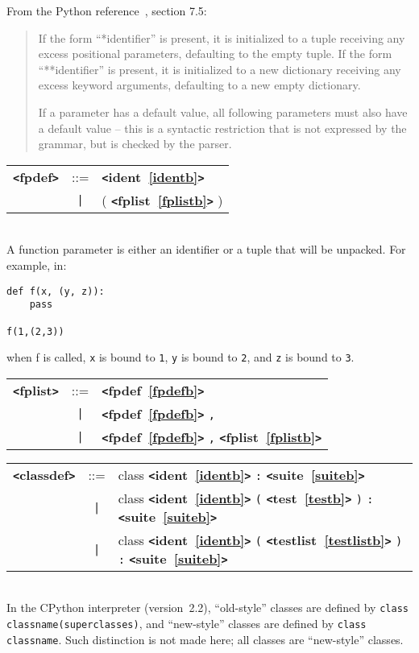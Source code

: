 From the Python reference~\cite{pythonlang}, section 7.5:
\begin{quote}
If the form ``*identifier'' is present, it is initialized to a tuple receiving 
any excess positional parameters, defaulting to the empty tuple. 
If the form ``**identifier'' is present, it is initialized to a new dictionary 
receiving any excess keyword arguments, defaulting to a new empty dictionary.

If a parameter has a default value, all following parameters must also have a 
default value -- this is a syntactic restriction that is not expressed by the grammar, but is checked by the parser.   
\end{quote}

\label{fpdefb}
\begin{tabular}{lcl}
{\bf \verb+<+fpdef\verb+>+} & ::=  & {\bf \verb+<+ident~\ref{identb}\verb+>+}  \\
 & \verb+|+  & ( {\bf \verb+<+fplist~\ref{fplistb}\verb+>+}  ) \\
\end{tabular} \\

A function parameter is either an identifier or a tuple that will be unpacked.  For example, in:
\begin{verbatim}
def f(x, (y, z)):
    pass

f(1,(2,3))
\end{verbatim}
when f is called, \verb|x| is bound to \verb|1|, \verb|y| is bound to \verb|2|, and
\verb|z| is bound to \verb|3|. \\

\label{fplistb}
\begin{tabular}{lcl}
{\bf \verb+<+fplist\verb+>+} & ::=  & {\bf \verb+<+fpdef~\ref{fpdefb}\verb+>+}  \\
 & \verb+|+  & {\bf \verb+<+fpdef~\ref{fpdefb}\verb+>+}  \verb|,| \\
 & \verb+|+  & {\bf \verb+<+fpdef~\ref{fpdefb}\verb+>+}  \verb|,| {\bf \verb+<+fplist~\ref{fplistb}\verb+>+}  \\
\end{tabular}

\label{classdefb}
\begin{tabular}{lcl}
{\bf \verb+<+classdef\verb+>+} & ::=  & class {\bf \verb+<+ident~\ref{identb}\verb+>+}  \verb|:| {\bf \verb+<+suite~\ref{suiteb}\verb+>+}  \\
 & \verb+|+  & class {\bf \verb+<+ident~\ref{identb}\verb+>+}  \verb|(| {\bf \verb+<+test~\ref{testb}\verb+>+}  \verb|)| \verb|:| {\bf \verb+<+suite~\ref{suiteb}\verb+>+}  \\
 & \verb+|+  & class {\bf \verb+<+ident~\ref{identb}\verb+>+}  \verb|(| {\bf \verb+<+testlist~\ref{testlistb}\verb+>+}  \verb|)| \verb|:| {\bf \verb+<+suite~\ref{suiteb}\verb+>+}  \\
\end{tabular} \\

In the CPython interpreter (version~2.2), ``old-style'' classes are defined by
\verb+class classname(superclasses)+, and ``new-style'' classes are defined by 
\verb+class classname+.  Such distinction is not made here; all classes
are ``new-style'' classes.

